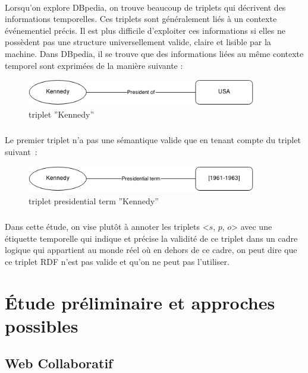 \paragraph{}
Lorsqu’on explore DBpedia, on trouve beaucoup de triplets qui décrivent des informations temporelles. Ces triplets sont généralement liés à un contexte événementiel précis.
Il est plus difficile d’exploiter ces informations si elles ne possèdent pas une structure universellement valide, claire et lisible par la machine. Dans DBpedia, il se trouve que des informations liées au même contexte temporel sont exprimées de la manière suivante : 
\begin{figure}[H]
        \centering
                \centering
                \includegraphics[width=10cm]{ken.png}
               \caption{triplet ''Kennedy''}

\end{figure}
\subparagraph{}
Le premier triplet n'a pas une sémantique valide que en tenant compte du triplet suivant~: 
\begin{figure}[H]
        \centering
                \centering
                \includegraphics[width=10cm]{presidterm.png}
               \caption{triplet presidential term ''Kennedy''}

\end{figure}
\subparagraph{}
Dans cette étude, on vise plutôt à annoter les triplets <$s$, $p$, $o$> avec une étiquette temporelle qui indique et précise la validité de ce triplet dans un cadre logique qui appartient au monde réel où en dehors de ce cadre, on peut dire que ce triplet RDF n’est pas valide et qu’on ne peut pas l’utiliser.

\section{Étude préliminaire et approches possibles}
\subsection{Web Collaboratif}
